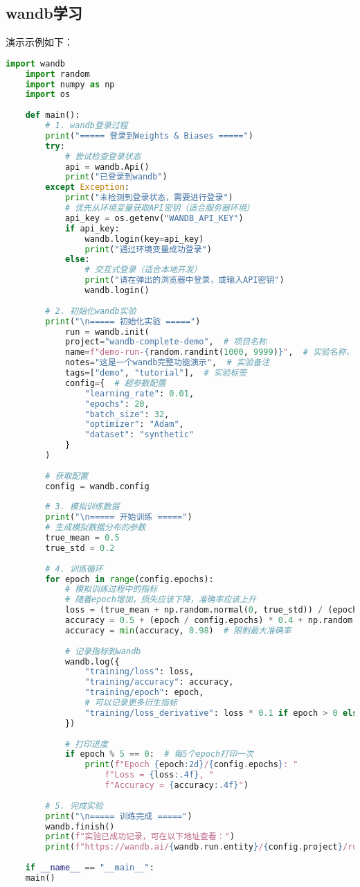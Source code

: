 \subsection{wandb学习}
演示示例如下：
\begin{lstlisting}[language=python,caption={wandb记录},label=code:wandb]
	import wandb
	import random
	import numpy as np
	import os
	
	def main():
		# 1. wandb登录过程
		print("===== 登录到Weights & Biases =====")
		try:
			# 尝试检查登录状态
			api = wandb.Api()
			print("已登录到wandb")
		except Exception:
			print("未检测到登录状态，需要进行登录")
			# 优先从环境变量获取API密钥（适合服务器环境）
			api_key = os.getenv("WANDB_API_KEY")
			if api_key:
				wandb.login(key=api_key)
				print("通过环境变量成功登录")
			else:
				# 交互式登录（适合本地开发）
				print("请在弹出的浏览器中登录，或输入API密钥")
				wandb.login()
		
		# 2. 初始化wandb实验
		print("\n===== 初始化实验 =====")
			run = wandb.init(
			project="wandb-complete-demo",  # 项目名称
			name=f"demo-run-{random.randint(1000, 9999)}",  # 实验名称，包含随机数避免重复
			notes="这是一个wandb完整功能演示",  # 实验备注
			tags=["demo", "tutorial"],  # 实验标签
			config={  # 超参数配置
				"learning_rate": 0.01,
				"epochs": 20,
				"batch_size": 32,
				"optimizer": "Adam",
				"dataset": "synthetic"
			}
		)
		
		# 获取配置
		config = wandb.config
		
		# 3. 模拟训练数据
		print("\n===== 开始训练 =====")
		# 生成模拟数据分布的参数
		true_mean = 0.5
		true_std = 0.2
		
		# 4. 训练循环
		for epoch in range(config.epochs):
			# 模拟训练过程中的指标
			# 随着epoch增加，损失应该下降，准确率应该上升
			loss = (true_mean + np.random.normal(0, true_std)) / (epoch + 1)
			accuracy = 0.5 + (epoch / config.epochs) * 0.4 + np.random.normal(0, 0.03)
			accuracy = min(accuracy, 0.98)  # 限制最大准确率
			
			# 记录指标到wandb
			wandb.log({
				"training/loss": loss,
				"training/accuracy": accuracy,
				"training/epoch": epoch,
				# 可以记录更多衍生指标
				"training/loss_derivative": loss * 0.1 if epoch > 0 else 0
			})
			
			# 打印进度
			if epoch % 5 == 0:  # 每5个epoch打印一次
				print(f"Epoch {epoch:2d}/{config.epochs}: "
					f"Loss = {loss:.4f}, "
					f"Accuracy = {accuracy:.4f}")
		
		# 5. 完成实验
		print("\n===== 训练完成 =====")
		wandb.finish()
		print(f"实验已成功记录，可在以下地址查看：")
		print(f"https://wandb.ai/{wandb.run.entity}/{config.project}/runs/{wandb.run.id}")
	
	if __name__ == "__main__":
	main()
\end{lstlisting}



